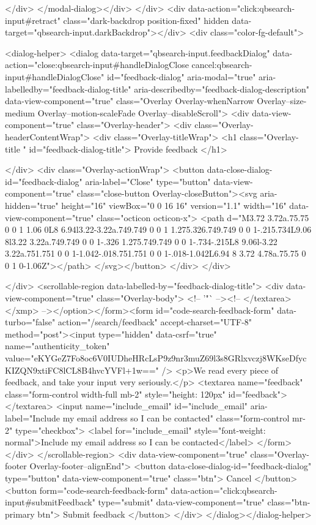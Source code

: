     </div>
</modal-dialog></div>
  </div>
  <div data-action="click:qbsearch-input#retract" class="dark-backdrop position-fixed" hidden data-target="qbsearch-input.darkBackdrop"></div>
  <div class="color-fg-default">
    
<dialog-helper>
  <dialog data-target="qbsearch-input.feedbackDialog" data-action="close:qbsearch-input#handleDialogClose cancel:qbsearch-input#handleDialogClose" id="feedback-dialog" aria-modal="true" aria-labelledby="feedback-dialog-title" aria-describedby="feedback-dialog-description" data-view-component="true" class="Overlay Overlay-whenNarrow Overlay--size-medium Overlay--motion-scaleFade Overlay--disableScroll">
    <div data-view-component="true" class="Overlay-header">
  <div class="Overlay-headerContentWrap">
    <div class="Overlay-titleWrap">
      <h1 class="Overlay-title " id="feedback-dialog-title">
        Provide feedback
      </h1>
        
    </div>
    <div class="Overlay-actionWrap">
      <button data-close-dialog-id="feedback-dialog" aria-label="Close" type="button" data-view-component="true" class="close-button Overlay-closeButton"><svg aria-hidden="true" height="16" viewBox="0 0 16 16" version="1.1" width="16" data-view-component="true" class="octicon octicon-x">
    <path d="M3.72 3.72a.75.75 0 0 1 1.06 0L8 6.94l3.22-3.22a.749.749 0 0 1 1.275.326.749.749 0 0 1-.215.734L9.06 8l3.22 3.22a.749.749 0 0 1-.326 1.275.749.749 0 0 1-.734-.215L8 9.06l-3.22 3.22a.751.751 0 0 1-1.042-.018.751.751 0 0 1-.018-1.042L6.94 8 3.72 4.78a.75.75 0 0 1 0-1.06Z"></path>
</svg></button>
    </div>
  </div>
  
</div>
      <scrollable-region data-labelled-by="feedback-dialog-title">
        <div data-view-component="true" class="Overlay-body">        <!-- '"` --><!-- </textarea></xmp> --></option></form><form id="code-search-feedback-form" data-turbo="false" action="/search/feedback" accept-charset="UTF-8" method="post"><input type="hidden" data-csrf="true" name="authenticity_token" value="eKYGeZ7Fo8oc6V0IUDheHRcLsP9z9nr3muZ69l3s8GRlxvczj8WKseDfycKIZQN9xtiFC8lCL8B4hvcYVFl+1w==" />
          <p>We read every piece of feedback, and take your input very seriously.</p>
          <textarea name="feedback" class="form-control width-full mb-2" style="height: 120px" id="feedback"></textarea>
          <input name="include_email" id="include_email" aria-label="Include my email address so I can be contacted" class="form-control mr-2" type="checkbox">
          <label for="include_email" style="font-weight: normal">Include my email address so I can be contacted</label>
</form></div>
      </scrollable-region>
      <div data-view-component="true" class="Overlay-footer Overlay-footer--alignEnd">          <button data-close-dialog-id="feedback-dialog" type="button" data-view-component="true" class="btn">    Cancel
</button>
          <button form="code-search-feedback-form" data-action="click:qbsearch-input#submitFeedback" type="submit" data-view-component="true" class="btn-primary btn">    Submit feedback
</button>
</div>
</dialog></dialog-helper>


